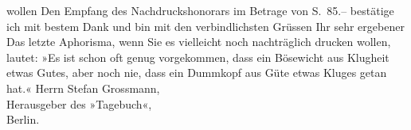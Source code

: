 \begin{ledgroupsized}[t]{13cm}
               wollen\pend
           \pstart
           Den Empfang des Nachdruckshonorars im Betrage von S. 85.– bestätige ich mit bestem
               Dank und bin mit den verbindlichsten Grüssen\pend
           \pstart Ihr sehr ergebener\pend{}{\bigskip}\pstart
           \noindent{}Das letzte Aphorisma, wenn Sie es vielleicht noch nachträglich drucken wollen,
                  lautet:\pend
           \pstart
           »Es ist schon oft genug vorgekommen, dass ein Bösewicht aus Klugheit etwas Gutes,
                  aber noch nie, dass ein Dummkopf aus Güte etwas Kluges getan hat.«\pend
           {\bigskip}\pstart
           \noindent{}Herrn Stefan Grossmann,{\\}Herausgeber des »Tagebuch«,{\\}Berlin.\pend
           
         
         \endnumbering{}\end{ledgroupsized}  \newcommand{\dateiname}{L02476}\newcommand{\titel}{Arthur Schnitzler an Stefan Großmann, 31. 5. 1926}\newcommand{\editorInnen}{Martin Anton Müller und Gerd-Hermann Susen}
      